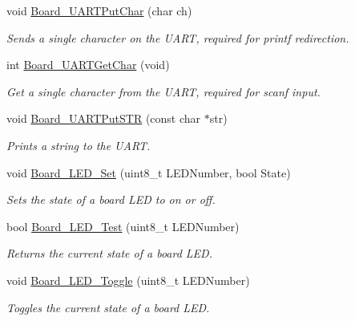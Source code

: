 \begin{DoxyCompactItemize}
void \hyperlink{group___b_o_a_r_d___c_o_m_m_o_n___a_p_i_gada2a79f4fcd7cd730317fc34291bf08e}{Board\+\_\+\+U\+A\+R\+T\+Put\+Char} (char ch)
\begin{DoxyCompactList}\small\item\em Sends a single character on the U\+A\+RT, required for printf redirection. \end{DoxyCompactList}\item 
int \hyperlink{group___b_o_a_r_d___c_o_m_m_o_n___a_p_i_ga4cffd2ff35f970b7dfad4fdf6419ecf6}{Board\+\_\+\+U\+A\+R\+T\+Get\+Char} (void)
\begin{DoxyCompactList}\small\item\em Get a single character from the U\+A\+RT, required for scanf input. \end{DoxyCompactList}\item 
void \hyperlink{group___b_o_a_r_d___c_o_m_m_o_n___a_p_i_gadaf1c6682fad416564e3113b628bb327}{Board\+\_\+\+U\+A\+R\+T\+Put\+S\+TR} (const char $\ast$str)
\begin{DoxyCompactList}\small\item\em Prints a string to the U\+A\+RT. \end{DoxyCompactList}\item 
void \hyperlink{group___b_o_a_r_d___c_o_m_m_o_n___a_p_i_ga4beb63d516764b260e9798642fab0047}{Board\+\_\+\+L\+E\+D\+\_\+\+Set} (uint8\+\_\+t L\+E\+D\+Number, bool State)
\begin{DoxyCompactList}\small\item\em Sets the state of a board L\+ED to on or off. \end{DoxyCompactList}\item 
bool \hyperlink{group___b_o_a_r_d___c_o_m_m_o_n___a_p_i_ga8e79f51947703de384c34bc86908bd9e}{Board\+\_\+\+L\+E\+D\+\_\+\+Test} (uint8\+\_\+t L\+E\+D\+Number)
\begin{DoxyCompactList}\small\item\em Returns the current state of a board L\+ED. \end{DoxyCompactList}\item 
void \hyperlink{group___b_o_a_r_d___c_o_m_m_o_n___a_p_i_ga39c663f67913226d0f29e11c0d0fd523}{Board\+\_\+\+L\+E\+D\+\_\+\+Toggle} (uint8\+\_\+t L\+E\+D\+Number)
\begin{DoxyCompactList}\small\item\em Toggles the current state of a board L\+ED. \end{DoxyCompactList}\end{DoxyCompactItemize}


